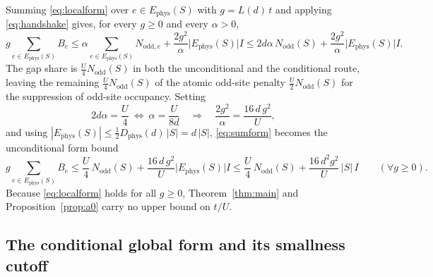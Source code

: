 \documentclass[11pt]{article}
\theoremstyle{plain}
\theoremstyle{definition}
\newcommand{\Nodd}{N_{\mathrm{odd}}}
\newcommand{\Dphys}{D_{\mathrm{phys}}}
\begin{document}
Summing \eqref{eq:localform} over $e\in E_{\mathrm{phys}}(S)$ with
$g=L(d)\,t$ and applying \eqref{eq:handshake} gives, for every $g\ge0$ and every
$\alpha>0$,
\begin{equation}\label{eq:sumform}
 g\!\!\sum_{e\in E_{\mathrm{phys}}(S)}\!\!B_e
 \le\alpha\!\!\sum_{e\in E_{\mathrm{phys}}(S)}\!\!N_{\mathrm{odd},e}
  +\frac{2g^2}{\alpha}\bigl|E_{\mathrm{phys}}(S)\bigr|I
 \le2d\alpha\,\Nodd(S)+\frac{2g^2}{\alpha}\bigl|E_{\mathrm{phys}}(S)\bigr|I .
\end{equation}
The gap share is $\frac U4\Nodd(S)$ in both the unconditional and the conditional
route, leaving the remaining $\frac U4\Nodd(S)$ of the atomic odd-site penalty
$\frac U2\Nodd(S)$ for the suppression of odd-site occupancy. Setting
\begin{equation}\label{eq:alpha}
 2d\alpha=\frac U4\ \Longleftrightarrow\ \alpha=\frac{U}{8d}
 \quad\Longrightarrow\quad \frac{2g^2}{\alpha}=\frac{16\,d\,g^2}{U},
\end{equation}
and using $|E_{\mathrm{phys}}(S)|\le\frac12\Dphys(d)\,|S|=d\,|S|$, \eqref{eq:sumform}
becomes the unconditional form bound
\begin{equation}\label{eq:unconditional}
 g\!\!\sum_{e\in E_{\mathrm{phys}}(S)}\!\!B_e
 \le\frac U4\,\Nodd(S)+\frac{16\,d\,g^2}{U}\bigl|E_{\mathrm{phys}}(S)\bigr|I
 \le\frac U4\,\Nodd(S)+\frac{16\,d^2g^2}{U}\,|S|\,I
 \qquad(\forall g\ge0).
\end{equation}
Because \eqref{eq:localform} holds for all $g\ge0$, Theorem~\ref{thm:main} and
Proposition~\ref{prop:a0} carry no upper bound on $t/U$.

\subsection{The conditional global form and its smallness cutoff}
\end{document}
